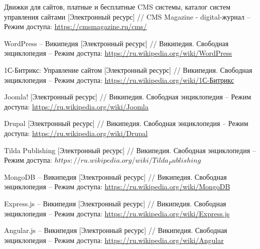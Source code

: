 \begin{thebibliography}{00}
        Движки для сайтов, платные и бесплатные CMS системы, каталог систем управления сайтами
        [Электронный ресурс] //
        CMS Magazine - digital-журнал
        --
        Режим доступа:
        \href{https://cmsmagazine.ru/cms/}{https://cmsmagazine.ru/cms/}

        WordPress -- Википедия 
        [Электронный ресурс] //
        Википедия. Свободная энциклопедия
        --
        Режим доступа:
        \href{https://ru.wikipedia.org/wiki/WordPress}{https://ru.wikipedia.org/wiki/WordPress}

        1С-Битрикс: Управление сайтом 
        [Электронный ресурс] //
        Википедия. Свободная энциклопедия
        --
        Режим доступа:
        \href{https://ru.wikipedia.org/wiki/1С-Битрикс}{https://ru.wikipedia.org/wiki/1С-Битрикс}

        Joomla!
        [Электронный ресурс] //
        Википедия. Свободная энциклопедия
        --
        Режим доступа:
        \href{https://ru.wikipedia.org/wiki/Joomla}{https://ru.wikipedia.org/wiki/Joomla}

        Drupal
        [Электронный ресурс] //
        Википедия. Свободная энциклопедия
        --
        Режим доступа:
        \href{https://ru.wikipedia.org/wiki/Drupal}{https://ru.wikipedia.org/wiki/Drupal}
        
        Tilda Publishing
        [Электронный ресурс] //
        Википедия. Свободная энциклопедия
        --
        Режим доступа:
        \href{https://ru.wikipedia.org/wiki/Tilda_Publishing}{$https://ru.wikipedia.org/wiki/Tilda_Publishing$}
        
        MongoDB -- Википедия 
        [Электронный ресурс] //
        Википедия. Свободная энциклопедия
        --
        Режим доступа:
        \href{https://ru.wikipedia.org/wiki/MongoDB}{https://ru.wikipedia.org/wiki/MongoDB}

        Express.js -- Википедия 
        [Электронный ресурс] //
        Википедия. Свободная энциклопедия
        --
        Режим доступа:
        \href{https://ru.wikipedia.org/wiki/Express.js}{https://ru.wikipedia.org/wiki/Express.js}

        Angular.js -- Википедия 
        [Электронный ресурс] //
        Википедия. Свободная энциклопедия
        --
        Режим доступа:
        \href{https://ru.wikipedia.org/wiki/Angular}{https://ru.wikipedia.org/wiki/Angular}
        


\end{thebibliography}
